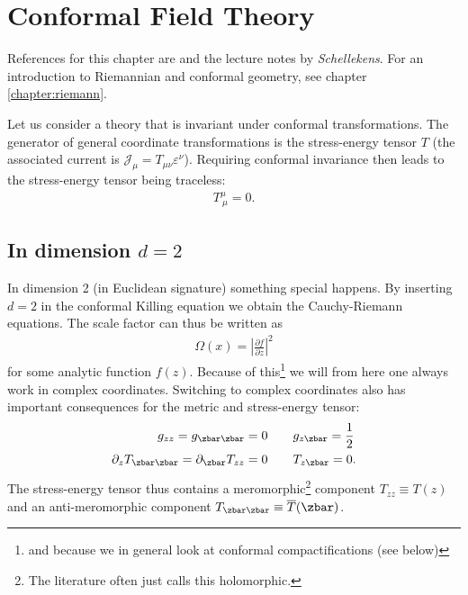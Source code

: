 \chapter{Conformal Field Theory}\label{chapter:CFT}

    References for this chapter are \cite{CFT} and the lecture notes by \textit{Schellekens}. For an introduction to Riemannian and conformal geometry, see chapter \ref{chapter:riemann}.

    \begin{property}
        Let us consider a theory that is invariant under conformal transformations. The generator of general coordinate transformations is the stress-energy tensor $T$ (the associated current is $\mathcal{J}_\mu = T_{\mu\nu}\varepsilon^\nu$). Requiring conformal invariance then leads to the stress-energy tensor being traceless:
        \begin{gather}
            T^\mu_{\ \mu} = 0.
        \end{gather}
    \end{property}

\section{\texorpdfstring{In dimension $d=2$}{In dimension d=2}}

    In dimension 2 (in Euclidean signature) something special happens. By inserting $d=2$ in the conformal Killing equation we obtain the Cauchy-Riemann equations. The scale factor can thus be written as
    \begin{gather}
        \Omega(x) = \left|\frac{\partial f}{\partial z}\right|^2
    \end{gather}
    for some analytic function $f(z)$. Because of this\footnote{and because we in general look at conformal compactifications (see below)} we will from here one always work in complex coordinates. Switching to complex coordinates also has important consequences for the metric and stress-energy tensor:
    \begin{align}
        g_{zz} = g_{\zbar\zbar} = 0&\qquad g_{z\zbar} = \frac{1}{2}\\
        \partial_zT_{\zbar\zbar} = \partial_{\zbar} T_{zz} = 0&\qquad T_{z\zbar} = 0.
    \end{align}
    The stress-energy tensor thus contains a meromorphic\footnote{The literature often just calls this holomorphic.} component $T_{zz}\equiv T(z)$ and an anti-meromorphic component $T_{\zbar\zbar}\equiv\overline{T}(\zbar)$.


